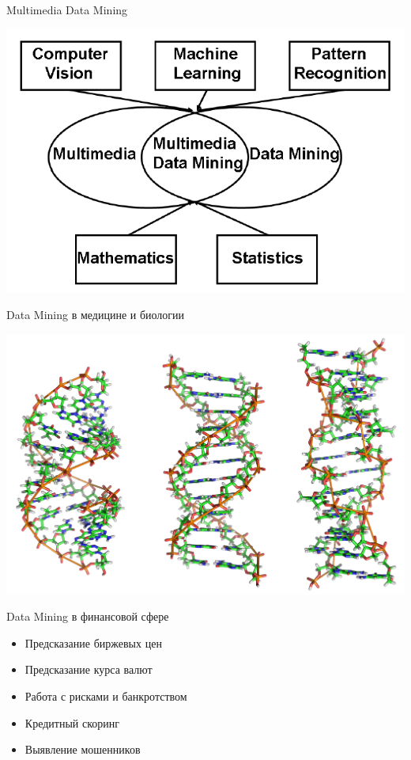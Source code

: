 \documentclass[aspectratio=169]{beamer}
\begin{document}
\begin{frame}{Multimedia Data Mining}

\begin{center}
\includegraphics[scale=0.325]{images/multimedia.png}
\end{center}

\end{frame}

\begin{frame}{Data Mining в медицине и биологии}

\begin{center}
\includegraphics[scale=1.5]{images/dna.png}
\end{center}

\end{frame}

\begin{frame}{Data Mining в финансовой сфере}

\begin{itemize}
\item Предсказание биржевых цен
\item Предсказание курса валют
\item Работа с рисками и банкротством
\item Кредитный скоринг
\item Выявление мошенников
\end{itemize}

\end{frame}
\end{document}
